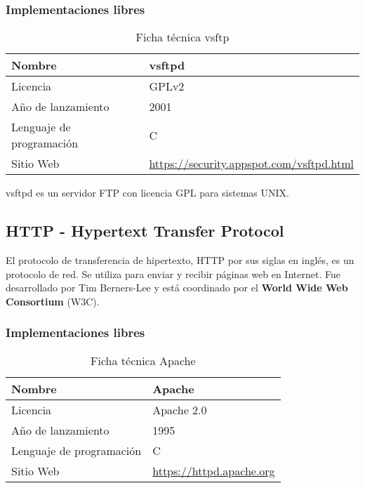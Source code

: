 \subsubsection {Implementaciones libres}

\begin{table}[H]
\begin{tabular}{|l|l|}
\hline
Nombre                   & vsftpd                       \\ \hline
Licencia                 & GPLv2                        \\ \hline
Año de lanzamiento       & 2001                         \\ \hline
Lenguaje de programación & C                            \\ \hline
Sitio Web                & \url{https://security.appspot.com/vsftpd.html} \\ \hline
\end{tabular}
\caption{Ficha técnica vsftp}
\end{table}

vsftpd es un servidor FTP con licencia GPL para sistemas UNIX.

\subsection {HTTP - Hypertext Transfer Protocol}

El protocolo de transferencia de hipertexto, HTTP por sus siglas en inglés, es un protocolo de red. Se utiliza para enviar y recibir páginas web en Internet. Fue desarrollado por Tim Berners-Lee y está coordinado por el \textbf{World Wide Web Consortium} (W3C).

\subsubsection {Implementaciones libres}

\begin{table}[H]
\begin{tabular}{|l|l|}
\hline
Nombre                   & Apache                       \\ \hline
Licencia                 & Apache 2.0                        \\ \hline
Año de lanzamiento       & 1995                         \\ \hline
Lenguaje de programación & C                            \\ \hline
Sitio Web                & \url{https://httpd.apache.org} \\ \hline
\end{tabular}
\caption{Ficha técnica Apache}
\end{table}

